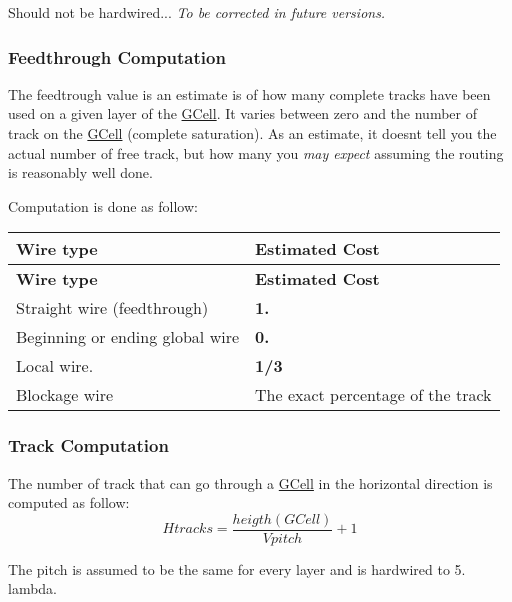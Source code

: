 Should not be hardwired... {\itshape To be corrected in future versions.}\hypertarget{classKatabatic_1_1GCell_secGCellFeedthrough}{}\subsubsection{Feedthrough Computation}\label{classKatabatic_1_1GCell_secGCellFeedthrough}
The feedtrough value is an estimate is of how many complete tracks have been used on a given layer of the \hyperlink{classKatabatic_1_1GCell}{G\+Cell}. It varies between zero and the number of track on the \hyperlink{classKatabatic_1_1GCell}{G\+Cell} (complete saturation). As an estimate, it doesn\textquotesingle{}t tell you the actual number of free track, but how many you {\itshape may expect} assuming the routing is reasonably well done.

Computation is done as follow\+: \tabulinesep=1mm
\begin{longtabu} spread 0pt [c]{*{2}{|X[-1]}|}
\hline
\rowcolor{\tableheadbgcolor}\textbf{ Wire type}&\textbf{ Estimated Cost }\\
\endfirsthead
\hline
\endfoot
\hline
\rowcolor{\tableheadbgcolor}\textbf{ Wire type}&\textbf{ Estimated Cost }\\
\endhead
Straight wire (feedthrough) &{\bfseries 1.} \\
Beginning or ending global wire &{\bfseries 0.} \\
Local wire. &{\bfseries 1/3} \\
Blockage wire &The exact percentage of the track \\
\end{longtabu}
\hypertarget{classKatabatic_1_1GCell_secGCellTrackComputation}{}\subsubsection{Track Computation}\label{classKatabatic_1_1GCell_secGCellTrackComputation}
The number of track that can go through a \hyperlink{classKatabatic_1_1GCell}{G\+Cell} in the horizontal direction is computed as follow\+: \[ Htracks = \frac{heigth(GCell)}{Vpitch} + 1 \]

The pitch is assumed to be the same for every layer and is hardwired to 5. lambda.

